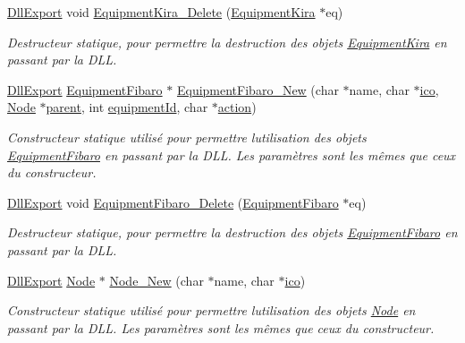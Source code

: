 \begin{DoxyCompactItemize}
\hyperlink{_room_8h_af83a0ad9d707a0bc5fe281b6e5c358a1}{Dll\+Export} void \hyperlink{namespace_e_p_a1c55c6edfd491299787f2fe87ed7a0a3}{Equipment\+Kira\+\_\+\+Delete} (\hyperlink{class_e_p_1_1_equipment_kira}{Equipment\+Kira} $\ast$eq)
\begin{DoxyCompactList}\small\item\em Destructeur statique, pour permettre la destruction des objets \hyperlink{class_e_p_1_1_equipment_kira}{Equipment\+Kira} en passant par la D\+LL. \end{DoxyCompactList}\item 
\hyperlink{_room_8h_af83a0ad9d707a0bc5fe281b6e5c358a1}{Dll\+Export} \hyperlink{class_e_p_1_1_equipment_fibaro}{Equipment\+Fibaro} $\ast$ \hyperlink{namespace_e_p_a25932da8d7ad42a69040703010a7beb0}{Equipment\+Fibaro\+\_\+\+New} (char $\ast$name, char $\ast$\hyperlink{namespace_e_p_a9bb18717237cbb94269e26c77cc04b05}{ico}, \hyperlink{class_e_p_1_1_node}{Node} $\ast$\hyperlink{namespace_e_p_ae54856cdea91964313d781ec414f88fc}{parent}, int \hyperlink{namespace_e_p_a720661c6f3b93cc86d108b686beac651}{equipment\+Id}, char $\ast$\hyperlink{namespace_e_p_a3f543204ed06fa87d908e9f15faf0c2a}{action})
\begin{DoxyCompactList}\small\item\em Constructeur statique utilisé pour permettre l\textquotesingle{}utilisation des objets \hyperlink{class_e_p_1_1_equipment_fibaro}{Equipment\+Fibaro} en passant par la D\+LL. Les paramètres sont les mêmes que ceux du constructeur. \end{DoxyCompactList}\item 
\hyperlink{_room_8h_af83a0ad9d707a0bc5fe281b6e5c358a1}{Dll\+Export} void \hyperlink{namespace_e_p_a25678b63737acb8852f497164fbeb884}{Equipment\+Fibaro\+\_\+\+Delete} (\hyperlink{class_e_p_1_1_equipment_fibaro}{Equipment\+Fibaro} $\ast$eq)
\begin{DoxyCompactList}\small\item\em Destructeur statique, pour permettre la destruction des objets \hyperlink{class_e_p_1_1_equipment_fibaro}{Equipment\+Fibaro} en passant par la D\+LL. \end{DoxyCompactList}\item 
\hyperlink{_room_8h_af83a0ad9d707a0bc5fe281b6e5c358a1}{Dll\+Export} \hyperlink{class_e_p_1_1_node}{Node} $\ast$ \hyperlink{namespace_e_p_ac7b7dbb1544b595e2b8f9cbe7ae72602}{Node\+\_\+\+New} (char $\ast$name, char $\ast$\hyperlink{namespace_e_p_a9bb18717237cbb94269e26c77cc04b05}{ico})
\begin{DoxyCompactList}\small\item\em Constructeur statique utilisé pour permettre l\textquotesingle{}utilisation des objets \hyperlink{class_e_p_1_1_node}{Node} en passant par la D\+LL. Les paramètres sont les mêmes que ceux du constructeur. \end{DoxyCompactList}\item 

\end{DoxyCompactItemize}
